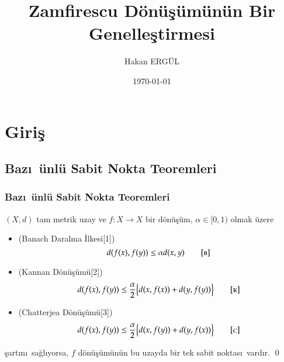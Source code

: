 \documentclass[sans,mathserif,8pt]{beamer}
\title{Zamfirescu D\"on\"u\c{s}\"um\"un\"un Bir Genelle\c{s}tirmesi}
\author{Hakan ERG\"UL}
\institute{Atat\"{u}rk \"{U}niversitesi}
\date{\today}
\begin{document}
\begin{frame}
\titlepage
\end{frame}

\section{Giri\c{s}}
\subsection{Baz\i \ \"{u}nl\"{u} Sabit Nokta Teoremleri}

\begin{frame}
\frametitle{Baz\i \ \"{u}nl\"{u} Sabit Nokta Teoremleri}
   $(X,d)$  tam metrik uzay ve $f: X \rightarrow X$ bir d\"{o}n\"{u}\c{s}\"{u}m, $\alpha \in [0,1)$ olmak \"{u}zere 
   \begin{itemize}[<+-| alert@+>]

   \item (Banach Daralma \.{I}lkesi[1])
     \begin{equation} 
       d(f(x), f(y))\leq \alpha d(x,y)
\tag*{\textsc{[b]}}
        \end{equation}
   \item (Kannan D\"{o}n\"{u}\c{s}\"{u}m\"{u}[2])
     \begin{equation} 
       d(f(x), f(y))\leq \frac{\alpha}{2}\big\{ d(x,f(x))+d(y,f(y))\big\}
\tag*{\textsc{[k]}}
         \end{equation}
   \item (Chatterjea D\"{o}n\"{u}\c{s}\"{u}m\"{u}[3])
     \begin{equation} 
       d(f(x), f(y))\leq \frac{\alpha}{2}\big\{ d(x,f(y))+d(y,f(x))\big\}
\tag*{\textsc{[c]}}
         \end{equation}
   \end{itemize}

\c{s}art\i n\i\ sa\u{g}l\i yorsa, $f$ d\"{o}n\"{u}\c{s}\"{u}m\"{u}n\"{u}n bu uzayda bir tek sabit noktas\i\ vard\i r.
    \qed
\end{frame}%
\end{document}
